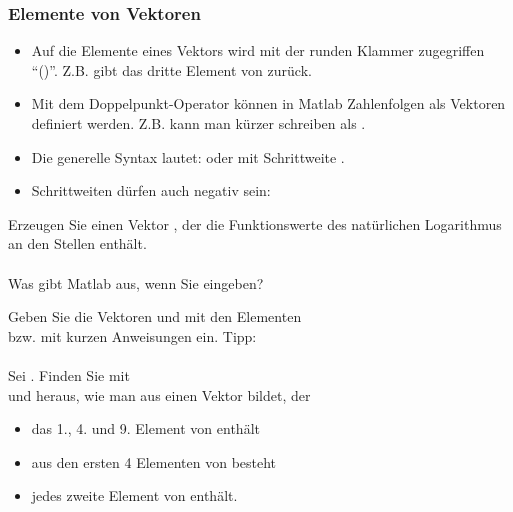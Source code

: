 \begin{frame}
  \frametitle{Elemente von Vektoren}
  \begin{itemize}
      \item Auf die Elemente eines Vektors wird mit der runden Klammer zugegriffen ``()''. Z.B. 
      gibt das dritte Element von  zurück.
      \item Mit dem Doppelpunkt-Operator \matlabInput{:} können in Matlab Zahlenfolgen als Vektoren definiert werden. Z.B. kann man
       kürzer schreiben als .
      \item Die generelle Syntax lautet:  oder  mit Schrittweite .
      \item Schrittweiten dürfen auch negativ sein: 
  \end{itemize}
\end{frame}

\secMexercise
\begin{frame}
  \frameMexercise
  \begin{exercise}
      Erzeugen Sie einen Vektor , der die Funktionswerte des natürlichen Logarithmus an den Stellen
       enthält. \\ \\

      Was gibt Matlab aus, wenn Sie  eingeben?
  \end{exercise}
\end{frame}

\secMexercise
\begin{frame}
  \frameMexercise
  \begin{exercise}
      Geben Sie die Vektoren  und  mit den Elementen \\
       bzw.  mit kurzen Anweisungen ein.
      \alert{Tipp}:  \\ \\

      Sei . Finden Sie mit \\
       und  heraus, wie man aus  einen Vektor bildet, der

      \begin{itemize}
          \item das 1., 4. und 9. Element von  enthält
          \item aus den ersten 4 Elementen von  besteht
          \item jedes zweite Element von  enthält.
      \end{itemize}
  \end{exercise}
\end{frame}

